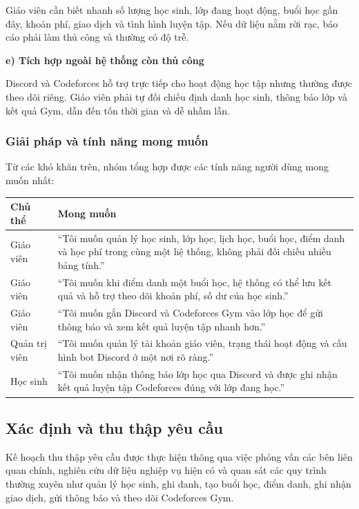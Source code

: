 \documentclass[12pt,a4paper]{article}
\begin{document}
Giáo viên cần biết nhanh số lượng học sinh, lớp đang hoạt động, buổi học gần
đây, khoản phí, giao dịch và tình hình luyện tập. Nếu dữ liệu nằm rời rạc, báo
cáo phải làm thủ công và thường có độ trễ.

\textbf{e) Tích hợp ngoài hệ thống còn thủ công}

Discord và Codeforces hỗ trợ trực tiếp cho hoạt động học tập nhưng thường được
theo dõi riêng. Giáo viên phải tự đối chiếu định danh học sinh, thông báo lớp và
kết quả Gym, dẫn đến tốn thời gian và dễ nhầm lẫn.

\subsubsection{Giải pháp và tính năng mong muốn}

Từ các khó khăn trên, nhóm tổng hợp được các tính năng người dùng mong muốn
nhất:

\begin{longtable}{L{3.2cm} L{11.2cm}}
\toprule
\textbf{Chủ thể} & \textbf{Mong muốn} \\
\midrule
\endhead
Giáo viên & ``Tôi muốn quản lý học sinh, lớp học, lịch học, buổi học, điểm danh và học phí trong cùng một hệ thống, không phải đối chiếu nhiều bảng tính.'' \\
Giáo viên & ``Tôi muốn khi điểm danh một buổi học, hệ thống có thể lưu kết quả và hỗ trợ theo dõi khoản phí, số dư của học sinh.'' \\
Giáo viên & ``Tôi muốn gắn Discord và Codeforces Gym vào lớp học để gửi thông báo và xem kết quả luyện tập nhanh hơn.'' \\
Quản trị viên & ``Tôi muốn quản lý tài khoản giáo viên, trạng thái hoạt động và cấu hình bot Discord ở một nơi rõ ràng.'' \\
Học sinh & ``Tôi muốn nhận thông báo lớp học qua Discord và được ghi nhận kết quả luyện tập Codeforces đúng với lớp đang học.'' \\
\bottomrule
\end{longtable}

\subsection{Xác định và thu thập yêu cầu}

Kế hoạch thu thập yêu cầu được thực hiện thông qua việc phỏng vấn các bên liên
quan chính, nghiên cứu dữ liệu nghiệp vụ hiện có và quan sát các quy trình
thường xuyên như quản lý học sinh, ghi danh, tạo buổi học, điểm danh, ghi nhận
giao dịch, gửi thông báo và theo dõi Codeforces Gym.
\end{document}
